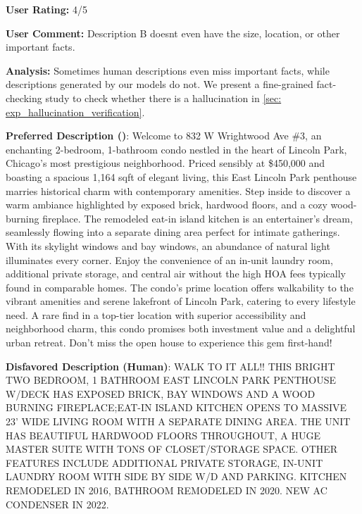\begin{center}
\begin{tcolorbox}[colback=white,colframe=gray!20,width=0.95\textwidth]
    {\footnotesize \textbf{User Rating:} 4/5 }
    \vspace{0.2em}

    {\footnotesize \textbf{User Comment:} Description B doesnt even have the size, location, or other important facts.  }
    \vspace{0.2em}

   {\footnotesize \textbf{Analysis:} Sometimes human descriptions even miss important facts, while descriptions generated by our models do not. We present a fine-grained fact-checking study to check whether there is a hallucination in \cref{sec: exp_hallucination_verification}. }
    \end{tcolorbox}\end{center}

    \begin{center}\begin{tcolorbox}[colback=white,colframe=gray!20,width=0.95\textwidth]
   {\footnotesize \textbf{Preferred Description (\agentname)}:  Welcome to 832 W Wrightwood Ave \#3, an enchanting 2-bedroom, 1-bathroom condo nestled in the heart of Lincoln Park, Chicago's most prestigious neighborhood. Priced sensibly at \$450,000 and boasting a spacious 1,164 sqft of elegant living, this East Lincoln Park penthouse marries historical charm with contemporary amenities. Step inside to discover a warm ambiance highlighted by exposed brick, hardwood floors, and a cozy wood-burning fireplace. The remodeled eat-in island kitchen is an entertainer's dream, seamlessly flowing into a separate dining area perfect for intimate gatherings. With its skylight windows and bay windows, an abundance of natural light illuminates every corner. Enjoy the convenience of an in-unit laundry room, additional private storage, and central air without the high HOA fees typically found in comparable homes. The condo's prime location offers walkability to the vibrant amenities and serene lakefront of Lincoln Park, catering to every lifestyle need. A rare find in a top-tier location with superior accessibility and neighborhood charm, this condo promises both investment value and a delightful urban retreat. Don't miss the open house to experience this gem first-hand! }
    \vspace{0.2em}

    {\footnotesize \textbf{Disfavored Description (Human)}:  WALK TO IT ALL!! THIS BRIGHT TWO BEDROOM, 1 BATHROOM EAST LINCOLN PARK PENTHOUSE W/DECK HAS EXPOSED BRICK, BAY WINDOWS AND A WOOD BURNING FIREPLACE;EAT-IN ISLAND KITCHEN OPENS TO MASSIVE 23' WIDE LIVING ROOM WITH A SEPARATE DINING AREA. THE UNIT HAS BEAUTIFUL HARDWOOD FLOORS THROUGHOUT, A HUGE MASTER SUITE WITH TONS OF CLOSET/STORAGE SPACE. OTHER FEATURES INCLUDE ADDITIONAL PRIVATE STORAGE, IN-UNIT LAUNDRY ROOM WITH SIDE BY SIDE W/D AND PARKING. KITCHEN REMODELED IN 2016, BATHROOM REMODELED IN 2020. NEW AC CONDENSER IN 2022. }
    \vspace{0.2em}


\end{tcolorbox}
\end{center}

